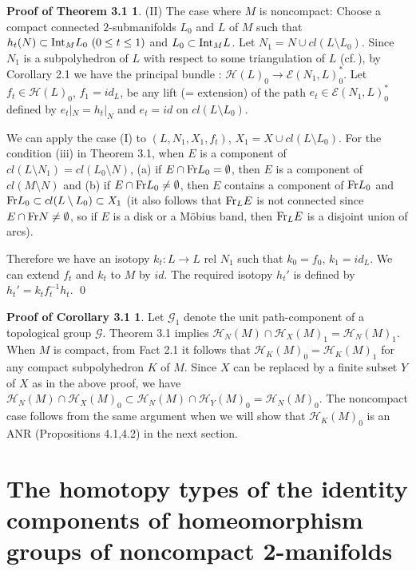 \documentclass[11pt]{amsart}
\theoremstyle{definition}
\newtheorem*{Proof of Theorem 3.1}{Proof of Theorem 3.1}
\newtheorem*{Proof of Corollary 3.1}{Proof of Corollary 3.1}
\newtheorem*{Proof of Proposition 4.1.(1)}{Proof of Proposition 4.1.(1)}
\newtheorem*{Proof of Proposition 4.1.(2)}{Proof of Proposition 4.1.(2)}
\newtheorem*{Proof of Corollary 1.1}{Proof of Corollary 1.1}
\def \cal {\mathcal}
\begin{document}
\begin{Proof of Theorem 3.1}
(II) The case where $M$ is noncompact: Choose a compact connected $2$-submanifolds $L_0$ and $L$ of $M$ such that $h_t(N) \subset {\rm Int}_M L_0 \ (0 \leq t \leq 1)$ and $L_0 \subset {\rm Int}_M L$. Let $N_1 = N \cup cl(L \setminus L_0)$. Since $N_1$ is a subpolyhedron of $L$ with respect to some triangulation of $L$ (cf.\,\cite{Ep}), by Corollary 2.1 we have the principal bundle : ${\cal H}(L)_0 \to {\cal E}(N_1, L)_0^{\ast}$. Let $f_t \in {\cal H}(L)_0$, $f_1 = id_L$, be any lift (= extension) of the path $e_t \in {\cal E}(N_1, L)_0^\ast$ defined by $e_t|_N = h_t|_N$ and $e_t = id$ on $cl(L \setminus L_0)$. 

We can apply the case (I) to $(L, N_1, X_1, f_t)$, $X_1= X \cup cl(L \setminus L_0)$. For the condition (iii) in Theorem 3.1, when $E$ is a component of $cl(L \setminus N_1) = cl(L_0 \setminus N)$, 
(a) if $E \cap {\rm Fr}L_0 = \emptyset$, then $E$ is a component of $cl(M \setminus N)$ and 
(b) if $E \cap {\rm Fr}L_0 \neq \emptyset$, then $E$ contains a component of ${\rm Fr}L_0$ and ${\rm Fr}L_0  \subset cl(L \setminus L_0) \subset X_1$ (it also follows that ${\rm Fr}_L E$ is not connected since $E \cap {\rm Fr}N \neq \emptyset$, so if $E$ is a disk or a M\"obius band, then ${\rm Fr}_L E$ is a disjoint union of arcs).

Therefore we have an isotopy $k_t : L \to L$ rel $N_1$ such that $k_0 = f_0$, $k_1 = id_L$. We can extend $f_t$ and $k_t$ to $M$ by $id$. The required isotopy $h_t'$ is defined by $h_t' = k_tf_t^{-1}h_t$. \qed 
\end{Proof of Theorem 3.1}

\begin{Proof of Corollary 3.1}
Let ${\cal G}_1$ denote the unit path-component of a topological group ${\cal G}$. Theorem 3.1 implies ${\cal H}_N(M) \cap {\cal H}_X(M)_1 = {\cal H}_N(M)_1$. When $M$ is compact, from Fact 2.1 it follows that ${\cal H}_K(M)_0 = {\cal H}_K(M)_1$ for any compact subpolyhedron $K$ of $M$. Since $X$ can be replaced by a finite subset $Y$ of $X$ as in the above proof, we have ${\cal H}_N(M) \cap {\cal H}_X(M)_0 \subset {\cal H}_N(M) \cap {\cal H}_Y(M)_0 = {\cal H}_N(M)_0$. The noncompact case follows from the same argument when we will show that ${\cal H}_K(M)_0$ is an ANR (Propositions 4.1,4.2) in the next section. 
\end{Proof of Corollary 3.1}


\section{The homotopy types of the identity components of homeomorphism groups of noncompact 2-manifolds}
\end{document}

